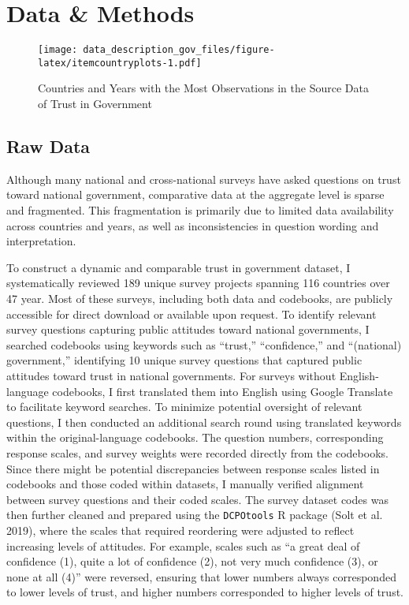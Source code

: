 \documentclass[
  12pt,
]{article}
\begin{document}
\section{Data \& Methods}\label{data-methods}

\begin{figure}
\centering
\texttt{[image: data\_description\_gov\_files/figure-latex/itemcountryplots-1.pdf]}
\caption{\label{fig:itemcountryplots}Countries and Years with the Most Observations in the Source Data of Trust in Government \label{tgov_item_country_plots}}
\end{figure}

\subsection{Raw Data}\label{raw-data}

Although many national and cross-national surveys have asked questions on trust toward national government, comparative data at the aggregate level is sparse and fragmented.
This fragmentation is primarily due to limited data availability across countries and years, as well as inconsistencies in question wording and interpretation.

To construct a dynamic and comparable trust in government dataset, I systematically reviewed 189 unique survey projects spanning 116 countries over 47 year.
Most of these surveys, including both data and codebooks, are publicly accessible for direct download or available upon request.
To identify relevant survey questions capturing public attitudes toward national governments, I searched codebooks using keywords such as ``trust,'' ``confidence,'' and ``(national) government,'' identifying 10 unique survey questions that captured public attitudes toward trust in national governments.
For surveys without English-language codebooks, I first translated them into English using Google Translate to facilitate keyword searches.
To minimize potential oversight of relevant questions, I then conducted an additional search round using translated keywords within the original-language codebooks.
The question numbers, corresponding response scales, and survey weights were recorded directly from the codebooks.
Since there might be potential discrepancies between response scales listed in codebooks and those coded within datasets, I manually verified alignment between survey questions and their coded scales.
The survey dataset codes was then further cleaned and prepared using the \texttt{DCPOtools} R package (Solt et al. 2019), where the scales that required reordering were adjusted to reflect increasing levels of attitudes.
For example, scales such as ``a great deal of confidence (1), quite a lot of confidence (2), not very much confidence (3), or none at all (4)'' were reversed, ensuring that lower numbers always corresponded to lower levels of trust, and higher numbers corresponded to higher levels of trust.
\end{document}

